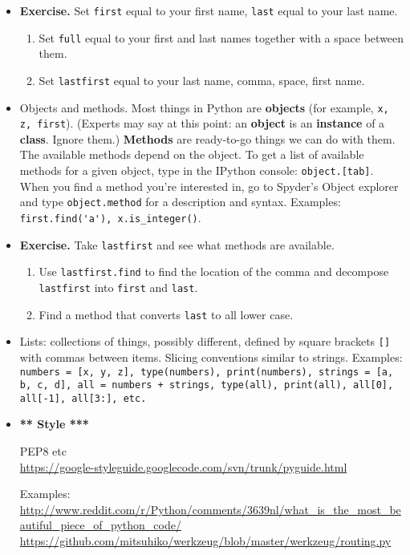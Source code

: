 \documentclass[11pt]{article}
\begin{document}
\begin{itemize}
\item {\bf Exercise.}  Set {\tt first} equal to your first name, {\tt last} equal to your last name.
\begin{enumerate}[label=(\alph*)]
\item Set {\tt full} equal to your first and last names together with a space between them.
\item Set {\tt lastfirst} equal to your last name, comma, space, first name.
\end{enumerate}

\item Objects and methods.
Most things in Python are {\bf objects}
(for example, {\tt x, z, first}).
(Experts may say at this point:  an {\bf object} is an {\bf instance} of a {\bf class}.
Ignore them.)
{\bf Methods} are ready-to-go things we can do with them.
The available methods depend on the object.
To get a list of available methods for a given object,
type in the IPython console: {\tt object.[tab]}.
When you find a method you're interested in,
go to Spyder's Object explorer
and type {\tt object.method} for a description and syntax.
Examples:  \verb:first.find('a'), x.is_integer():.

\item {\bf Exercise.}  Take {\tt lastfirst} and see what methods are available.
\begin{enumerate}[label=(\alph*)]
\item Use {\tt lastfirst.find} to find the location of the comma and
decompose {\tt lastfirst} into {\tt first} and {\tt last}.
\item Find a method that converts {\tt last} to all lower case.
\end{enumerate}

\item Lists: collections of things, possibly different, defined by square brackets
{\tt []} with commas between items.
Slicing conventions similar to strings.
Examples:  {\tt numbers = [x, y, z], type(numbers),
print(numbers),
strings = [a, b, c, d],
all = numbers + strings, type(all),
print(all),
all[0], all[-1], all[3:], etc.}

\item {\bf *** Style ***}

PEP8 etc \\
\url{https://google-styleguide.googlecode.com/svn/trunk/pyguide.html}

Examples:  \\
\url{http://www.reddit.com/r/Python/comments/3639nl/what_is_the_most_beautiful_piece_of_python_code/}\\
\url{https://github.com/mitsuhiko/werkzeug/blob/master/werkzeug/routing.py} \\




\end{itemize}
\end{document}
